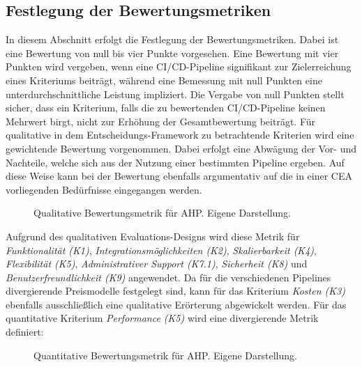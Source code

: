 \subsection{Festlegung der Bewertungsmetriken}
\label{sec:Metriken}
In diesem Abschnitt erfolgt die Festlegung der Bewertungsmetriken. Dabei ist eine Bewertung von null bis vier Punkte vorgesehen. Eine Bewertung mit vier Punkten wird vergeben, wenn eine CI/CD-Pipeline signifikant zur Zielerreichung eines Kriteriums beiträgt, während eine Bemessung mit null Punkten eine unterdurchschnittliche Leistung impliziert. Die Vergabe von null Punkten stellt sicher, dass ein Kriterium, falls die zu bewertenden CI/CD-Pipeline keinen Mehrwert birgt, nicht zur Erhöhung der Gesamtbewertung beiträgt. Für qualitative in dem Entscheidungs-Framework zu betrachtende Kriterien wird eine gewichtende Bewertung vorgenommen. Dabei erfolgt eine Abwägung der Vor- und Nachteile, welche sich aus der Nutzung einer bestimmten Pipeline ergeben. Auf diese Weise kann bei der Bewertung ebenfalls argumentativ auf die in einer CEA vorliegenden Bedürfnisse eingegangen werden.
\begin{center}
	\begin{figure}[H]
		\centering
		\caption[Qualitative Bewertungsmetrik für AHP]{Qualitative Bewertungsmetrik für AHP. Eigene Darstellung.}
		\label{fig:metrik}
	\end{figure}
\end{center}
\vspace*{-15mm}
Aufgrund des qualitativen Evaluations-Designs wird diese Metrik für \textit{Funktionalität (K1)}, \textit{Integrationsmöglichkeiten (K2)}, \textit{Skalierbarkeit (K4)}, \textit{Flexibilität (K5)}, \textit{Administrativer Support (K7.1)}, \textit{Sicherheit (K8)} und \textit{Benutzerfreundlichkeit (K9)} angewendet. Da für die verschiedenen Pipelines divergierende Preismodelle festgelegt sind, kann für das Kriterium \textit{Kosten (K3)} ebenfalls ausschließlich eine qualitative Erörterung abgewickelt werden. Für das quantitative Kriterium \textit{Performance (K5)} wird eine divergierende Metrik definiert: 
\begin{center}
	\begin{figure}[H]
		\centering
		\caption[Quantitative Bewertungsmetrik für AHP]{Quantitative Bewertungsmetrik für AHP. Eigene Darstellung.}
		\label{fig:metrik_qual}
	\end{figure}
\end{center}
